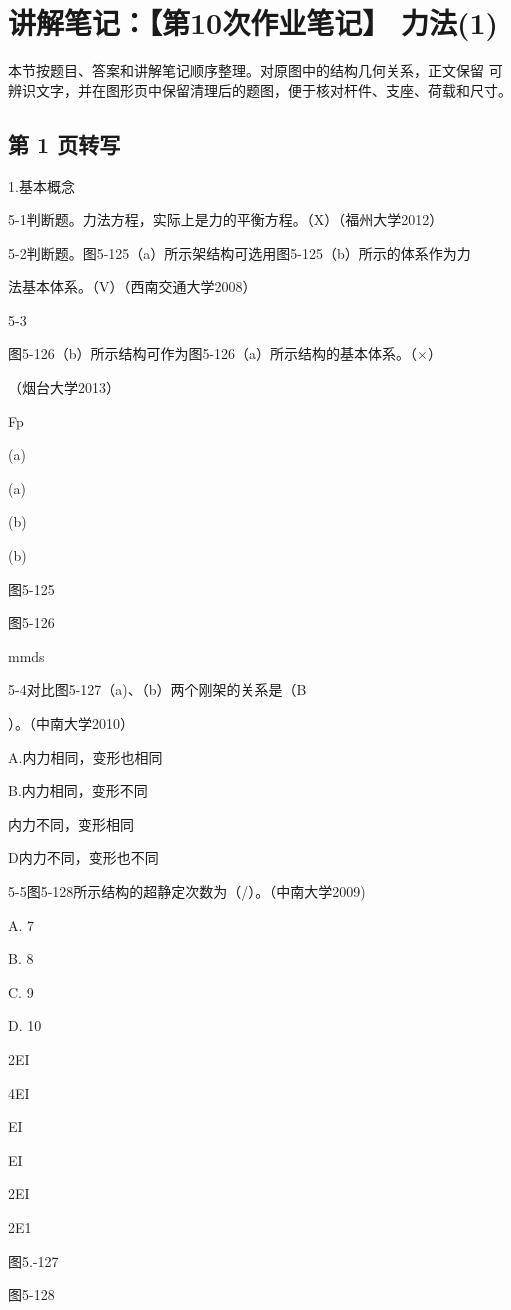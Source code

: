 \section{讲解笔记：【第10次作业笔记】 力法(1)}
\begin{analysisbox}
本节按题目、答案和讲解笔记顺序整理。对原图中的结构几何关系，正文保留 可辨识文字，并在图形页中保留清理后的题图，便于核对杆件、支座、荷载和尺寸。
\end{analysisbox}
\subsection*{第 1 页转写}
1.基本概念

5-1判断题。力法方程，实际上是力的平衡方程。（X）（福州大学2012）

5-2判断题。图5-125（a）所示架结构可选用图5-125（b）所示的体系作为力

法基本体系。（V）（西南交通大学2008）

5-3

图5-126（b）所示结构可作为图5-126（a）所示结构的基本体系。（$\times$）

（烟台大学2013）

Fp

(a)

(a)

(b)

(b)

图5-125

图5-126

mmds

5-4对比图5-127（a)、（b）两个刚架的关系是（B

）。（中南大学2010）

A.内力相同，变形也相同

B.内力相同，变形不同

内力不同，变形相同

D内力不同，变形也不同

5-5图5-128所示结构的超静定次数为（/）。（中南大学2009)

A. 7

B. 8

C. 9

D. 10

2EI

4EI

EI

EI

2EI

2E1

图5.-127

图5-128

